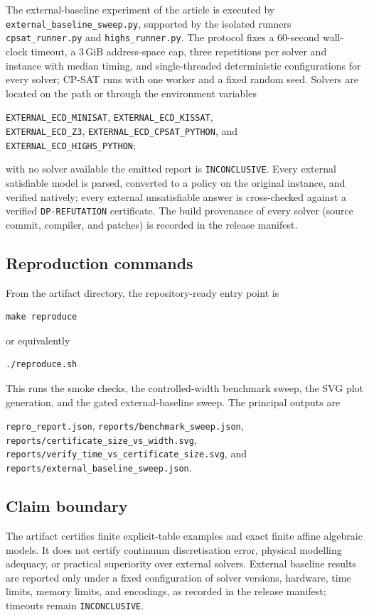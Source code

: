 The external-baseline experiment of the article is executed by
\texttt{external\_baseline\_sweep.py}, supported by the isolated runners
\texttt{cpsat\_runner.py} and \texttt{highs\_runner.py}. The protocol fixes a
60-second wall-clock timeout, a 3\,GiB address-space cap, three repetitions per
solver and instance with median timing, and single-threaded deterministic
configurations for every solver; CP-SAT runs with one worker and a fixed random
seed. Solvers are located on the path or through the environment variables
\begin{center}
\texttt{EXTERNAL\_ECD\_MINISAT}, \texttt{EXTERNAL\_ECD\_KISSAT},\\
\texttt{EXTERNAL\_ECD\_Z3}, \texttt{EXTERNAL\_ECD\_CPSAT\_PYTHON}, and
\texttt{EXTERNAL\_ECD\_HIGHS\_PYTHON};
\end{center}
with no solver available the emitted report is \texttt{INCONCLUSIVE}. Every
external satisfiable model is parsed, converted to a policy on the original
instance, and verified natively; every external unsatisfiable answer is
cross-checked against a verified \texttt{DP-REFUTATION} certificate. The build
provenance of every solver (source commit, compiler, and patches) is recorded
in the release manifest.

\subsection{Reproduction commands}

From the artifact directory, the repository-ready entry point is
\begin{verbatim}
make reproduce
\end{verbatim}
or equivalently
\begin{verbatim}
./reproduce.sh
\end{verbatim}
This runs the smoke checks, the controlled-width benchmark sweep, the SVG plot
generation, and the gated external-baseline sweep. The principal outputs are
\begin{center}
\texttt{repro\_report.json}, \texttt{reports/benchmark\_sweep.json},\\
\texttt{reports/certificate\_size\_vs\_width.svg},\\
\texttt{reports/verify\_time\_vs\_certificate\_size.svg}, and\\
\texttt{reports/external\_baseline\_sweep.json}.
\end{center}

\subsection{Claim boundary}

The artifact certifies finite explicit-table examples and exact finite affine
algebraic models. It does not certify continuum discretisation error, physical
modelling adequacy, or practical superiority over external solvers. External
baseline results are reported only under a fixed configuration of solver
versions, hardware, time limits, memory limits, and encodings, as recorded in
the release manifest; timeouts remain \texttt{INCONCLUSIVE}.
